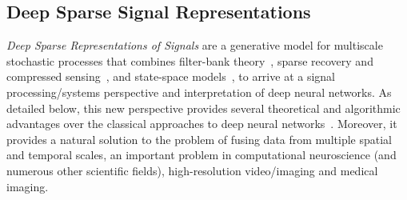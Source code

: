 \documentclass[12pt]{article}
\begin{document}
%

\subsection*{Deep Sparse Signal Representations}

\emph{Deep Sparse Representations of Signals} are a generative model for multiscale stochastic processes that combines filter-bank theory~\cite{fliege1994multirate,strang1996wavelets,daubechies1992ten}, sparse recovery and compressed sensing~\cite{donoho2006compressed,candes2008introduction}, and state-space models~\cite{Ba:12,ba2013b}, to arrive at a signal processing/systems perspective and interpretation of deep neural networks. As detailed below, this new perspective provides several theoretical and algorithmic advantages over the classical approaches to deep neural networks~\cite{lecun2015deep}. Moreover, it provides a natural solution to the problem of fusing data from multiple spatial and temporal scales, an important problem in computational neuroscience (and numerous other scientific fields), high-resolution video/imaging and medical imaging.
\end{document}

